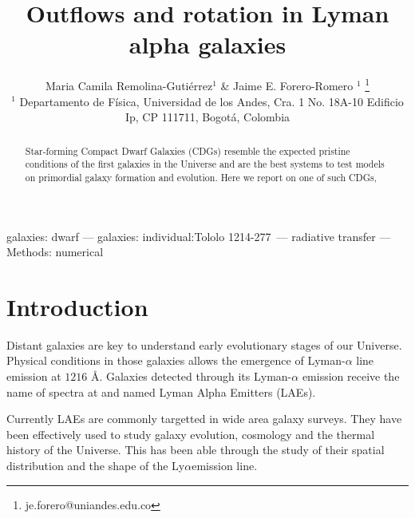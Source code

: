 \documentclass[a4,useAMS,usenatbib,usegraphicx]{mn2e}
\newcommand{\tol}{Tololo 1214-277}
\newcommand{\lya}{Ly$\alpha$}
\begin{document}
\title[Outflows and rotation in LAEs]{
Outflows and rotation in Lyman alpha galaxies}
\author[M.C. Remolina-Gutierrez \& J.E. Forero-Romero]{
  Maria Camila Remolina-Guti\'errez$^1$ \&
  Jaime E. Forero-Romero $^{1}$ \thanks{je.forero@uniandes.edu.co}\\
  $^1$ Departamento de F\'isica, Universidad de los Andes, Cra. 1
  No. 18A-10 Edificio Ip, CP 111711, Bogot\'a, Colombia \\
}

\maketitle
       

\begin{abstract}
  Star-forming Compact Dwarf Galaxies (CDGs) resemble the expected
  pristine conditions of the first galaxies in the Universe and
  are the best systems to test models on primordial
galaxy formation and evolution.    
Here we report on one of such CDGs,

\end{abstract}

\begin{keywords}
galaxies: dwarf --- galaxies: individual:\tol\ --- radiative transfer --- Methods: numerical 
\end{keywords}




\section{Introduction}
\label{sec:intro}

Distant galaxies are key to understand early evolutionary stages of
our Universe.
Physical conditions in those galaxies allows the emergence of
Lyman-$\alpha$ line emission at $1216$ \AA \cite{PartrigePeebles}.
Galaxies detected through its Lyman-$\alpha$ emission receive the name of
spectra at  and named Lyman Alpha Emitters (LAEs).

Currently LAEs are commonly targetted in wide area galaxy surveys.
They have been effectively used to study galaxy evolution,
cosmology and the thermal history of the Universe.
This has been able through the study of their spatial distribution and
the shape of the \lya emission line.
\end{document}
